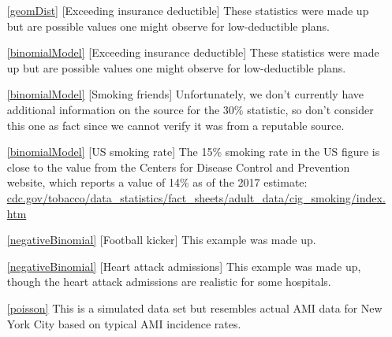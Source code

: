 \begin{itemize}
\item[\ref{geomDist}]
    [Exceeding insurance deductible]
    These statistics were made up but are possible
    values one might observe for low-deductible plans.

\item[\ref{binomialModel}]
    [Exceeding insurance deductible]
    These statistics were made up but are possible
    values one might observe for low-deductible plans.
\item[\ref{binomialModel}]
    [Smoking friends]
    Unfortunately, we don't currently have additional
    information on the source for the 30\% statistic,
    so don't consider this one as fact since we cannot
    verify it was from a reputable source.    
\item[\ref{binomialModel}]
    [US smoking rate]
    The 15\% smoking rate in the US figure is close to
    the value from the Centers for Disease Control and
    Prevention website, which reports a value of 14\%
    as of the 2017 estimate: \\
    \href{https://www.cdc.gov/tobacco/data_statistics/fact_sheets/adult_data/cig_smoking/index.htm}{cdc.gov/tobacco/data\_statistics/fact\_sheets/adult\_data/cig\_smoking/index.htm}

\item[\ref{negativeBinomial}]
    [Football kicker]
    This example was made up.
\item[\ref{negativeBinomial}]
    [Heart attack admissions]
    This example was made up, though the heart attack
    admissions are realistic for some hospitals.

\item[\ref{poisson}]
    This is a simulated data set but resembles actual
    AMI data for New York City based on typical AMI
    incidence rates.
\end{itemize}








\section{}
\label{ch_foundations_for_inf_data}

